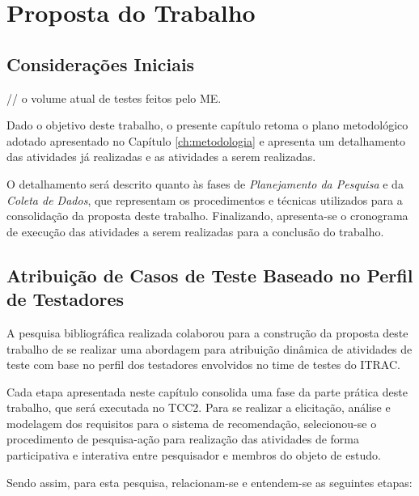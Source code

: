 \chapter{Proposta do Trabalho}
\label{ch:proposta}

\section{Considerações Iniciais}

// o volume atual de testes feitos pelo ME. 

Dado o objetivo deste trabalho, o presente capítulo retoma o plano metodológico adotado apresentado no Capítulo \ref{ch:metodologia} e apresenta um detalhamento das atividades já realizadas e as atividades a serem realizadas. 

O detalhamento será descrito quanto às fases de \textit{Planejamento da Pesquisa} e da \textit{Coleta de Dados}, que representam os procedimentos e técnicas utilizados para a consolidação da proposta deste trabalho. Finalizando, apresenta-se o cronograma de execução das atividades a serem realizadas para a conclusão do trabalho.

\section{Atribuição de Casos de Teste Baseado no Perfil de Testadores}

A pesquisa bibliográfica realizada colaborou para a construção da proposta deste trabalho de se realizar uma abordagem para atribuição dinâmica de atividades de teste com base no perfil dos testadores envolvidos no time de testes do ITRAC. 

Cada etapa apresentada neste capítulo consolida uma fase da parte prática deste trabalho, que será executada no TCC2. Para se realizar a elicitação, análise e modelagem dos requisitos para o sistema de recomendação, selecionou-se o procedimento de pesquisa-ação para realização das
atividades de forma participativa e interativa entre pesquisador e membros do objeto de estudo.

Sendo assim, para esta pesquisa, relacionam-se e entendem-se as seguintes etapas:


